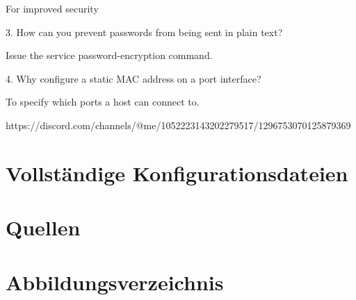 \documentclass[a4paper]{article}
\begin{document}
For improved security

3. How can you prevent passwords from being sent in plain text?

Issue the service password-encryption command.

4. Why configure a static MAC address on a port interface?

To specify which ports a host can connect to.

https://discord.com/channels/@me/1052223143202279517/1296753070125879369
\newpage

\section{Vollständige Konfigurationsdateien}

\newpage

\section{Quellen}

\newpage
\section{Abbildungsverzeichnis}

\listoffigures
\end{document}
